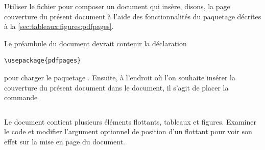 \begin{exercice}
  Utiliser le fichier  pour composer un
  document qui insère, disons, la page couverture du présent document
  à l'aide des fonctionnalités du paquetage  décrites à
  la \autoref{sec:tableaux:figures:pdfpages}.
  \begin{sol}
    Le préambule du document devrait contenir la déclaration
\begin{lstlisting}
\usepackage{pdfpages}
\end{lstlisting}
    pour charger le paquetage . Ensuite, à l'endroit où
    l'on souhaite insérer la couverture du présent document dans le
    document, il s'agit de placer la commande
\begin{lstlisting}

\end{lstlisting}
  \end{sol}
\end{exercice}

\begin{exercice}[nosol]
  Le document  contient plusieurs éléments
  flottants, tableaux et figures. Examiner le code et modifier
  l'argument optionnel de position d'un flottant pour voir son effet
  sur la mise en page du document.
\end{exercice}


